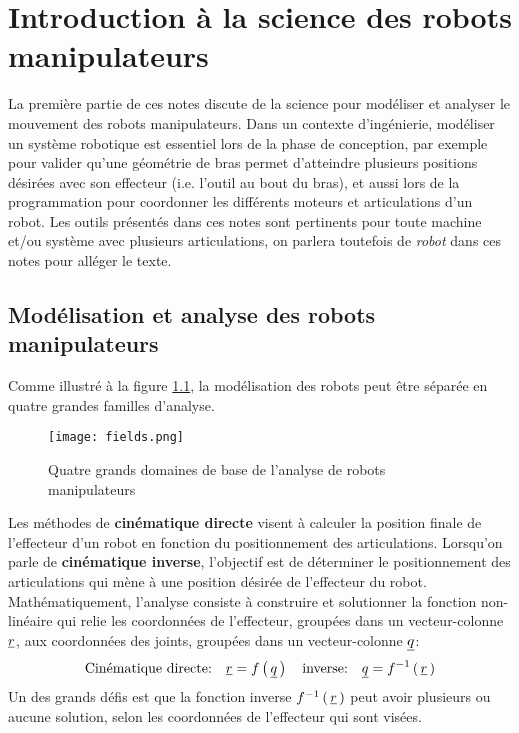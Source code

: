 \chapter{Introduction à la science des robots manipulateurs}

La première partie de ces notes discute de la science pour modéliser et analyser le mouvement des robots manipulateurs. Dans un contexte d'ingénierie, modéliser un système robotique est essentiel lors de la phase de conception, par exemple pour valider qu'une géométrie de bras permet d'atteindre plusieurs positions désirées avec son effecteur (i.e. l'outil au bout du bras), et aussi lors de la programmation pour coordonner les différents moteurs et articulations d'un robot. Les outils présentés dans ces notes sont pertinents pour toute machine et/ou système avec plusieurs articulations, on parlera toutefois de \textit{robot} dans ces notes pour alléger le texte.

\section{Modélisation et analyse des robots manipulateurs}

Comme illustré à la figure \ref{fig:fields}, la modélisation des robots peut être séparée en quatre grandes familles d'analyse.

\begin{figure}[H]
	\centering
		\texttt{[image: fields.png]}
	\caption{Quatre grands domaines de base de l'analyse de robots manipulateurs  }
	\label{fig:fields}
\end{figure}




Les méthodes de \textbf{cinématique directe} visent à calculer la position finale de l'effecteur d'un robot en fonction du positionnement des articulations. Lorsqu'on parle de \textbf{cinématique inverse}, l'objectif est de déterminer le positionnement des articulations qui mène à une position désirée de l'effecteur du robot. Mathématiquement, l'analyse consiste à construire et solutionner la fonction non-linéaire qui relie les coordonnées de l'effecteur, groupées dans un vecteur-colonne $\underline{r}$, aux coordonnées des joints, groupées dans un vecteur-colonne $\underline{q}$:
\begin{equation}
\text{Cinématique directe:}  \quad \underline{r} = f\left( \, \underline{q} \, \right)  \quad  \text{inverse:} \quad \underline{q} = f^{-1}\left( \, \underline{r}  \, \right) 
\end{equation}
Un des grands défis est que la fonction inverse $f^{-1}\left( \, \underline{r}  \, \right)$ peut avoir plusieurs ou aucune solution, selon les coordonnées de l'effecteur qui sont visées. 


